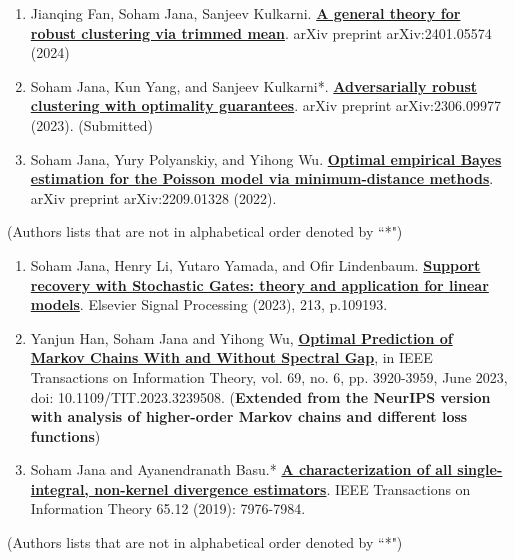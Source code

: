 \documentclass[letterpaper,11pt,oneside]{article}
\theoremstyle{definition}
\begin{document}
		\begin{enumerate}
			\item Jianqing Fan, Soham Jana, Sanjeev Kulkarni. \href{https://arxiv.org/abs/2401.05574}{\bf A general theory for robust clustering via trimmed mean}. arXiv preprint arXiv:2401.05574 (2024)
			
			\item Soham Jana, Kun Yang, and Sanjeev Kulkarni*. \href{https://arxiv.org/abs/2306.09977}{\bf Adversarially robust clustering with optimality guarantees}. arXiv preprint arXiv:2306.09977 (2023). (Submitted)
			
			\item Soham Jana, Yury Polyanskiy, and Yihong Wu. \href{https://arxiv.org/abs/2209.01328}{\bf Optimal empirical Bayes estimation for the Poisson model via minimum-distance methods}. arXiv preprint arXiv:2209.01328 (2022).
			
		\end{enumerate}
		
		(Authors lists that are not in alphabetical order denoted by ``*")
		
		\begin{enumerate}
			\item Soham Jana, Henry Li, Yutaro Yamada, and Ofir Lindenbaum. {\bf \href{https://www.sciencedirect.com/science/article/abs/pii/S0165168423002670}{\bf Support recovery with Stochastic Gates: theory and application for linear models}}. Elsevier Signal Processing (2023), 213, p.109193.
			
			\item Yanjun Han, Soham Jana and Yihong Wu, \href{https://ieeexplore.ieee.org/abstract/document/10028667}{\bf Optimal Prediction of Markov Chains With and Without Spectral Gap}, in IEEE Transactions on Information Theory, vol. 69, no. 6, pp. 3920-3959, June 2023, doi: 10.1109/TIT.2023.3239508. (\textbf{Extended from the NeurIPS version with analysis of higher-order Markov chains and different loss functions})
			
			\item Soham Jana and Ayanendranath Basu.* \href{https://janasoham.github.io/files/bregman_charac.pdf}{\bf A characterization of all single-integral, non-kernel divergence estimators}. IEEE Transactions on Information Theory 65.12 (2019): 7976-7984.
			
		\end{enumerate}
		
		(Authors lists that are not in alphabetical order denoted by ``*")
		
\end{document}
